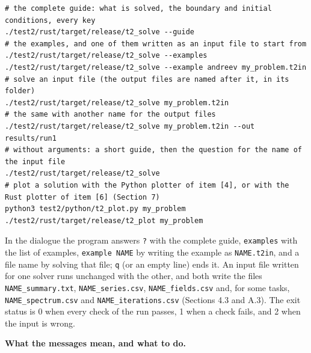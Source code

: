 \documentclass[
  10pt,
]{article}
\begin{document}
\begin{verbatim}
# the complete guide: what is solved, the boundary and initial conditions, every key
./test2/rust/target/release/t2_solve --guide
# the examples, and one of them written as an input file to start from
./test2/rust/target/release/t2_solve --examples
./test2/rust/target/release/t2_solve --example andreev my_problem.t2in
# solve an input file (the output files are named after it, in its folder)
./test2/rust/target/release/t2_solve my_problem.t2in
# the same with another name for the output files
./test2/rust/target/release/t2_solve my_problem.t2in --out results/run1
# without arguments: a short guide, then the question for the name of the input file
./test2/rust/target/release/t2_solve
# plot a solution with the Python plotter of item [4], or with the Rust plotter of item [6] (Section 7)
python3 test2/python/t2_plot.py my_problem
./test2/rust/target/release/t2_plot my_problem
\end{verbatim}

In the dialogue the program answers \texttt{?} with the complete guide,
\texttt{examples} with the list of examples, \texttt{example\ NAME} by
writing the example as \texttt{NAME.t2in}, and a file name by solving
that file; \texttt{q} (or an empty line) ends it. An input file written
for one solver runs unchanged with the other, and both write the files
\texttt{NAME\_summary.txt}, \texttt{NAME\_series.csv},
\texttt{NAME\_fields.csv} and, for some tasks,
\texttt{NAME\_spectrum.csv} and \texttt{NAME\_iterations.csv} (Sections
4.3 and A.3). The exit status is 0 when every check of the run passes, 1
when a check fails, and 2 when the input is wrong.

\textbf{What the messages mean, and what to do.}
\end{document}
